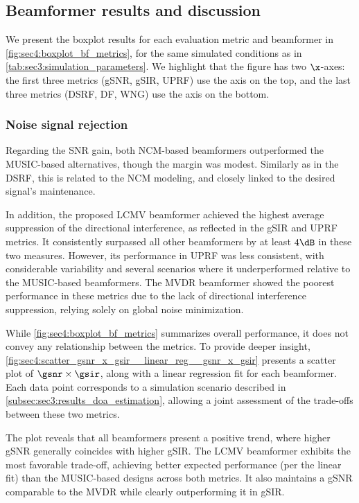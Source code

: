 \subsection{Beamformer results and discussion}

We present the boxplot results for each evaluation metric and beamformer in \cref{fig:sec4:boxplot_bf_metrics}, for the same simulated conditions as in \cref{tab:sec3:simulation_parameters}. We highlight that the figure has two $\x$-axes: the first three metrics (gSNR, gSIR, UPRF) use the axis on the top, and the last three metrics (DSRF, DF, WNG) use the axis on the bottom.



\subsubsection*{Noise signal rejection}

Regarding the SNR gain, both NCM-based beamformers outperformed the MUSIC-based alternatives, though the margin was modest. Similarly as in the DSRF, this is related to the NCM modeling, and closely linked to the desired signal's maintenance.

In addition, the proposed LCMV beamformer achieved the highest average suppression of the directional interference, as reflected in the gSIR and UPRF metrics. It consistently surpassed all other beamformers by at least $4\dB$ in these two measures. However, its performance in UPRF was less consistent, with considerable variability and several scenarios where it underperformed relative to the MUSIC-based beamformers. The MVDR beamformer showed the poorest performance in these metrics due to the lack of directional interference suppression, relying solely on global noise minimization.

While \cref{fig:sec4:boxplot_bf_metrics} summarizes overall performance, it does not convey any relationship between the metrics. To provide deeper insight, \cref{fig:sec4:scatter_gsnr_x_gsir__linear_reg__gsnr_x_gsir} presents a scatter plot of $\gsnr \times \gsir$, along with a linear regression fit for each beamformer. Each data point corresponds to a simulation scenario described in \cref{subsec:sec3:results_doa_estimation}, allowing a joint assessment of the trade-offs between these two metrics.

The plot reveals that all beamformers present a positive trend, where higher gSNR generally coincides with higher gSIR. The LCMV beamformer exhibits the most favorable trade-off, achieving better expected performance (per the linear fit) than the MUSIC-based designs across both metrics. It also maintains a gSNR comparable to the MVDR while clearly outperforming it in gSIR.

